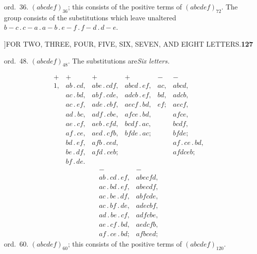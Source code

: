 \documentclass[11pt]{article}
\begin{document}
\smallskip
\hspace{1em} ord.\ 36. $(abcdef)_{36}$; this consists of the positive terms
of $(abcdef)_{72}$. The group consists of the substitutions which leave
unaltered $b-c\,.\,c-a\,.\,a-b\,.\,e-f\,.\,f-d\,.\,d-e$.

\newpage
{}]\hfill FOR TWO, THREE, FOUR, FIVE, SIX, SEVEN, AND EIGHT LETTERS.\hfill\textbf{127}

\smallskip
\hspace{1em} ord.\ 48. $(abcdef)_{48}$. The substitutions are\hfill\textit{Six letters.}

\smallskip
\[
\begin{array}{llllll}
+ & + & + & + & - & -\\
1, & ab\,.\,cd, & abe\,.\,cdf, & abcd\,.\,ef, & ac, & abcd,\\
   & ac\,.\,bd, & abf\,.\,cde, & adcb\,.\,ef, & bd, & adcb,\\
   & ac\,.\,ef, & ade\,.\,cbf, & aecf\,.\,bd, & ef; & aecf,\\
   & ad\,.\,bc, & adf\,.\,cbe, & afce\,.\,bd, &     & afce,\\
   & ae\,.\,cf, & aeb\,.\,cfd, & bcdf\,.\,ac, &     & bcdf,\\
   & af\,.\,ce, & aed\,.\,cfb, & bfde\,.\,ac; &     & bfde;\\
   & bd\,.\,ef, & afb\,.\,ced, &              &     & af\,.\,ce\,.\,bd,\\
   & be\,.\,df, & afd\,.\,ceb; &              &     & afdceb;\\
   & bf\,.\,de. & & & & \\
\end{array}
\]
\[
\begin{array}{ll}
- & -\\
ab\,.\,cd\,.\,ef, & abecfd,\\
ac\,.\,bd\,.\,ef, & abecdf,\\
ac\,.\,be\,.\,df, & abfcde,\\
ac\,.\,bf\,.\,de, & adecbf,\\
ad\,.\,be\,.\,cf, & adfcbe,\\
ae\,.\,cf\,.\,bd, & aedcfb,\\
af\,.\,ce\,.\,bd; & afbced;
\end{array}
\]
\hspace{1em} ord.\ 60. $(abcdef)_{60}$; this consists of the positive terms
of $(abcdef)_{120}$.
\end{document}
